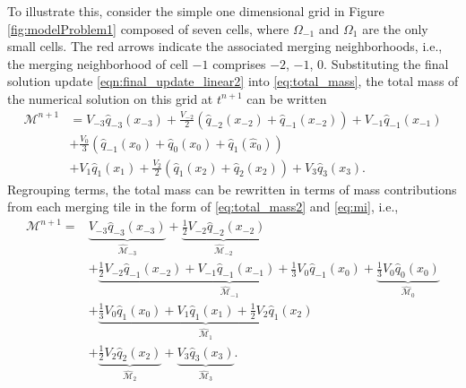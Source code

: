 To illustrate this, consider the simple one dimensional grid in Figure \ref{fig:modelProblem1} composed of seven cells, where $\Omega_{-1}$ and $\Omega_{1}$ are the only small cells.  The red arrows indicate the associated merging neighborhoods, i.e., the merging neighborhood of cell $-1$ comprises $-2$, $-1$, $0$.
Substituting the final solution update \eqref{eqn:final_update_linear2} into \eqref{eq:total_mass}, the total mass of the numerical solution on this grid at $t^{n+1}$ can be written
\begin{equation}
\begin{aligned}
\mathcal{M}^{n+1} &= V_{-3} \widehat q_{-3}(x_{-3}) + \frac{V_{-2}}{2} \left(  \widehat q_{-2}(x_{-2}) + \widehat q_{-1}(x_{-2}) \right) + V_{-1} \widehat q_{-1}(x_{-1}) \\
& + \frac{V_0}{3}\left( \widehat q_{-1}(x_0) + \widehat q_{0}(x_0) + \widehat q_{1}(\widehat{x}_0)\right) \\
&+ V_{1} \widehat q_{1}(x_{1}) + \frac{V_{2}}{2} \left(  \widehat q_{1}(x_{2}) + \widehat q_{2}(x_{2}) \right)  + V_{3} \widehat q_{3}(x_{3}) .
\end{aligned}
\end{equation}
Regrouping terms, the total mass can be rewritten in terms of mass contributions from each merging tile in the form of \eqref{eq:total_mass2} and \eqref{eq:mi}, i.e.,
\begin{equation}
\begin{aligned}
\mathcal{M}^{n+1} = &\underbrace{V_{-3} \widehat q_{-3}(x_{-3}) }_{\widehat{\mathcal{M}}_{-3}} + \underbrace{\frac{1}{2}V_{-2} \widehat q_{-2}(x_{-2})}_{\widehat{\mathcal{M}}_{-2}} \\
& + \underbrace{\frac{1}{2}V_{-2}\widehat q_{-1}(x_{-2})+V_{-1}\widehat q_{-1}(x_{-1}) + \frac{1}{3}V_{0}\widehat q_{-1}(x_{0})}_{\widehat{\mathcal{M}}_{-1}} +  \underbrace{\frac{1}{3}V_0\widehat q_{0}(x_{0})}_{\widehat{\mathcal{M}}_{0}} \\
& + \underbrace{\frac{1}{3}V_{0}\widehat q_{1}(x_{0}) + V_{1}\widehat q_{1}(x_{1}) + \frac{1}{2}V_{2}\widehat q_{1}(x_{2})}_{\widehat{\mathcal{M}}_{1}} \\
 & + \underbrace{\frac{1}{2}V_{2} \widehat q_{2}(x_{2})}_{\widehat{\mathcal{M}}_{2}} + \underbrace{V_{3} \widehat q_{3}(x_{3}) }_{\widehat{\mathcal{M}}_{3}} .
\end{aligned}
\end{equation}

